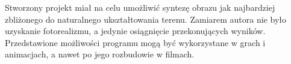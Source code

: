 Stworzony projekt miał na celu umożliwić syntezę obrazu jak najbardziej zbliżonego do naturalnego ukształtowania terenu. Zamiarem autora nie było uzyskanie fotorealizmu, a jedynie osiągnięcie przekonujących wyników. Przedstawione możliwości programu mogą być wykorzystane w grach i animacjach, a nawet po jego rozbudowie w filmach.


